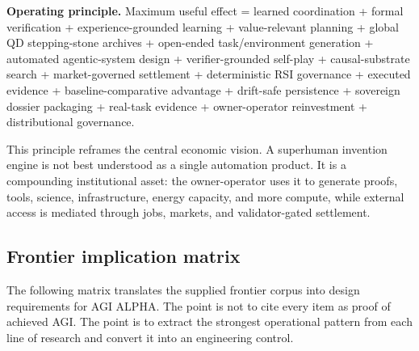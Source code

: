 \textbf{Operating principle.} Maximum useful effect = learned
coordination + formal verification + experience-grounded learning +
value-relevant planning + global QD stepping-stone archives + open-ended
task/environment generation + automated agentic-system design +
verifier-grounded self-play + causal-substrate search + market-governed
settlement + deterministic RSI governance + executed evidence +
baseline-comparative advantage + drift-safe persistence + sovereign
dossier packaging + real-task evidence + owner-operator reinvestment +
distributional governance.

This principle reframes the central economic vision. A superhuman
invention engine is not best understood as a single automation product.
It is a compounding institutional asset: the owner-operator uses it to
generate proofs, tools, science, infrastructure, energy capacity, and
more compute, while external access is mediated through jobs, markets,
and validator-gated settlement.

\subsection{Frontier implication
matrix}\label{frontier-implication-matrix}

The following matrix translates the supplied frontier corpus into design
requirements for AGI ALPHA. The point is not to cite every item as proof
of achieved AGI. The point is to extract the strongest operational
pattern from each line of research and convert it into an engineering
control.

